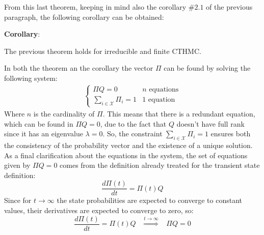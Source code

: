 \documentclass[12pt,a4paper]{article}
\begin{document}
\noindent
From this last theorem, keeping in mind also the corollary $\#2.1$ of the previous paragraph, the following corollary can be obtained:

\bigskip
\noindent
\textbf{Corollary}: 

\noindent
The previous theorem holds for irreducible and finite CTHMC.

\bigskip
\noindent
In both the theorem an the corollary the vector $\Pi$ can be found by solving the following system:
$$
\begin{matrix}
\begin{cases}
\Pi Q=0 & n \textrm{ equations}\\
\underset{i\in\mathcal{X}}{\sum{}}{\Pi_i=1} & 1 \textrm{ equation}
\end{cases}
\end{matrix}
$$
Where $n$ is the cardinality of $\Pi$. This means that there is a redundant equation, which can be found in $\Pi Q=0$, due to the fact that $Q$ doesn't have full rank since it has an eigenvalue $\lambda =0$. So, the constraint $\sum_{i\in\mathcal{X}}{\Pi_i=1}$ ensures both the consistency of the probability vector and the existence of a unique solution.
As a final clarification about the equations in the system, the set of equations given by $\Pi Q=0$ comes from the definition already treated for the transient state definition:
$$
\frac{d\Pi(t)}{dt}=\Pi(t)Q
$$ 
Since for $t\rightarrow\infty$ the state probabilities are expected to converge to constant values, their derivatives are expected to converge to zero, so:
$$
\frac{d\Pi(t)}{dt}=\Pi(t)Q \hspace{10pt} \overset{t\rightarrow\infty}{\Rightarrow}\hspace{10pt} \Pi Q=0
$$
\newpage
\end{document}
